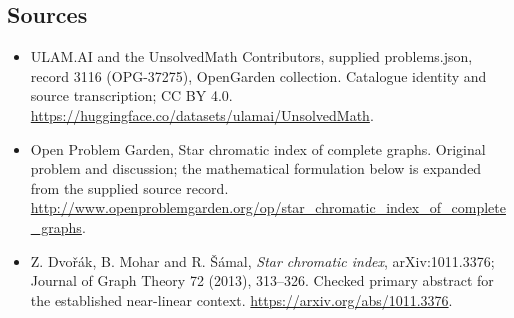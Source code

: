 \documentclass[11pt,a4paper]{article}
\begin{document}
\subsection{Sources}
\begin{itemize}
\item[S1] ULAM.AI and the UnsolvedMath Contributors, supplied problems.json, record 3116 (OPG-37275), OpenGarden collection. Catalogue identity and source transcription; CC BY 4.0.
\url{https://huggingface.co/datasets/ulamai/UnsolvedMath}.
\item[S2] Open Problem Garden, Star chromatic index of complete graphs. Original problem and discussion; the mathematical formulation below is expanded from the supplied source record.
\url{http://www.openproblemgarden.org/op/star_chromatic_index_of_complete_graphs}.
\item[R1] Z. Dvořák, B. Mohar and R. Šámal, \emph{Star chromatic index}, arXiv:1011.3376; Journal of Graph Theory 72 (2013), 313--326. Checked primary abstract for the established near-linear context.
\url{https://arxiv.org/abs/1011.3376}.
\end{itemize}
\end{document}
